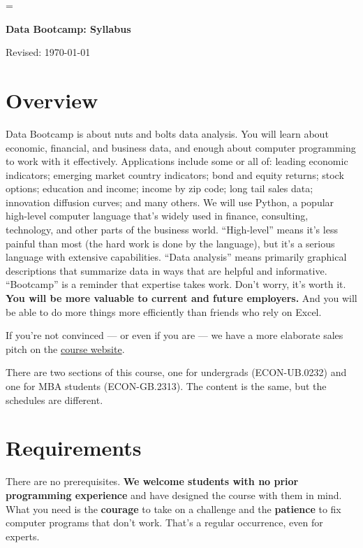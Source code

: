 \documentclass[11pt]{article}
\begin{document}
\parskip=\bigskipamount
\parindent=0.0in
\thispagestyle{empty}


\bigskip\bigskip
\centerline{\Large \bf Data Bootcamp:  Syllabus}
\centerline{Revised: \today}


\section*{Overview}

Data Bootcamp is about nuts and bolts data analysis. You will learn about economic, financial, and business
data, and enough about computer programming to work with it effectively.
Applications include some or all of: leading economic indicators; emerging market country indicators;
bond and equity returns; stock options; education and income; income by zip code; long tail sales data; innovation diffusion curves; and many others.
We will use Python, a popular high-level computer language that's widely used in finance, consulting,
technology, and other parts of the business world.
``High-level'' means it's less painful than most (the hard work is done by the language),
but it's a serious language with extensive capabilities.
``Data analysis'' means primarily graphical descriptions that summarize data
in ways that are helpful and informative.
``Bootcamp'' is a reminder that expertise takes work. Don't worry, it's worth it.
{\bf You will be more valuable to current and future employers.\/}
And you will be able to do more things more efficiently than
friends who rely on Excel.

If you're not convinced --- or even if you are ---
we have a more elaborate sales pitch on the
\href{http://nyudatabootcamp.github.io/website/}{course website}.

There are two sections of this course,
one for undergrads (ECON-UB.0232) and one for MBA students (ECON-GB.2313).
The content is the same, but the schedules are different.


\section*{Requirements}

There are no prerequisites.
{\bf We welcome students with no prior programming experience\/}
and have designed the course with them in mind.
What you need is the {\bf courage\/} to take on a challenge
and the {\bf patience\/} to fix computer programs that don't work.
That's a regular occurrence, even for experts.
\end{document}
